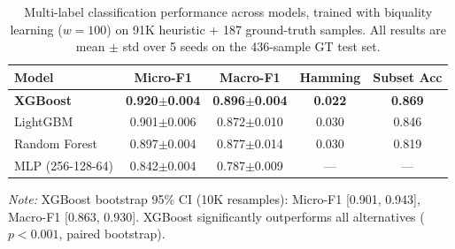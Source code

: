 \begin{table}[t]
\centering
\caption{Multi-label classification performance across models, trained with
biquality learning ($w{=}100$) on 91K heuristic + 187 ground-truth samples.
All results are mean $\pm$ std over 5 seeds on the 436-sample GT test set.}
\label{tab:ml_results}
\small
\begin{tabular}{lcccc}
\toprule
\textbf{Model} & \textbf{Micro-F1} & \textbf{Macro-F1} & \textbf{Hamming} & \textbf{Subset Acc} \\
\midrule
\textbf{XGBoost} & \textbf{0.920$\pm$0.004} & \textbf{0.896$\pm$0.004} & \textbf{0.022} & \textbf{0.869} \\
LightGBM         & 0.901$\pm$0.006          & 0.872$\pm$0.010          & 0.030           & 0.846 \\
Random Forest    & 0.897$\pm$0.004          & 0.877$\pm$0.014          & 0.030           & 0.819 \\
MLP (256-128-64) & 0.842$\pm$0.004          & 0.787$\pm$0.009          & ---             & --- \\
\bottomrule
\end{tabular}
\vspace{1mm}
\raggedright
\footnotesize
\textit{Note:} XGBoost bootstrap 95\% CI (10K resamples): Micro-F1
[0.901, 0.943], Macro-F1 [0.863, 0.930]. XGBoost significantly outperforms
all alternatives ($p < 0.001$, paired bootstrap).
\end{table}
